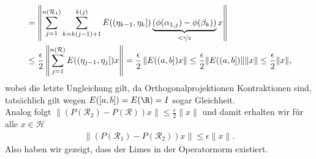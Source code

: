 \begin{solution}
\begin{align*}
  &= \left\|
  \sum_{j=1}^{n(\mathcal{R}_1)}\sum_{k =k(j-1)+1}^{k(j)}
  E((\eta_{k-1},\eta_{k}])
  \underbrace{(\phi(\alpha_{1,j}) - \phi(\beta_k))}_{<\nicefrac{\epsilon}{2}}x\right\| \\
  &\leq \frac{\epsilon}{2}\left\|
  \sum_{j=1}^{n(\mathcal{R})}
  E((\eta_{j-1},\eta_{j}])x\right\|
  = \frac{\epsilon}{2}\left\|E((a,b])x\right\| \leq \frac{\epsilon}{2}\|E((a,b])\|\|x\|
  \leq \frac{\epsilon}{2}\|x\|,
\end{align*}
wobei die letzte Ungleichung gilt, da Orthogonalprojektionen Kontraktionen sind, tatsächlich gilt wegen $E([a, b]) = E(\R) = I$ sogar Gleichheit. \\
Analog folgt $\|(P(\mathcal{R}_2) - P(\mathcal{R}))x\| \leq \frac{\epsilon}{2}\|x\|$
und damit erhalten wir für alle $x \in \mathcal{H}$
\begin{align*}
  \|(P(\mathcal{R}_1) - P(\mathcal{R}_2))x\| \leq \epsilon\|x\|.
\end{align*}
Also haben wir gezeigt, dass der Limes in der Operatornorm existiert. \\



\end{solution}
